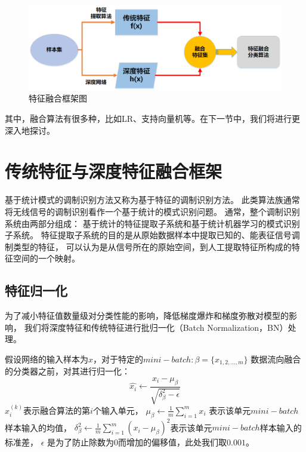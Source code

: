 \begin{figure}[!h]
	\centering
	\includegraphics[scale=0.5]{figures/chapter_4/fig_4_1.png}
	\caption{特征融合框架图}\label{sec:fig_4_1}
\end{figure}

其中，融合算法有很多种，比如LR、支持向量机等。在下一节中，我们将进行更深入地探讨。


\section{传统特征与深度特征融合框架}

基于统计模式的调制识别方法又称为基于特征的调制识别方法。
此类算法族通常将无线信号的调制识别看作一个基于统计的模式识别问题。
通常，整个调制识别系统由两部分组成：
基于统计的特征提取子系统和基于统计机器学习的模式识别子系统。
特征提取子系统的目的是从原始数据样本中提取已知的、能表征信号调制类型的特征，
可以认为是从信号所在的原始空间，到人工提取特征所构成的特征空间的一个映射。\par

\subsection{特征归一化}
\label{sec:feature_normalization}
为了减小特征值数量级对分类性能的影响，降低梯度爆炸和梯度弥散对模型的影响，
我们将深度特征和传统特征进行批归一化（Batch Normalization，BN）处理。\par

假设网络的输入样本为$x$，对于特定的$mini-batch: \beta=\{x_{1,2,...,m}\}$
数据流向融合的分类器之前，对其进行归一化：
\begin{equation}
	\label{eqt:4_18}
	\hat{x_i} \leftarrow \frac{x_i - \mu_\beta}{\sqrt{\delta_\beta^2 - \epsilon}}
\end{equation}
$x_i^{(k)}$表示融合算法的第$i$个输入单元，
$\mu_\beta \leftarrow \frac{1}{m}\sum_{i=1}^{m} x_i$ 表示该单元$mini-batch$样本输入的均值，
$	\delta_\beta^2 \leftarrow \frac{1}{m}\sum_{i=1}^{m}(x_i - \mu_\beta)^2$表示该单元$mini-batch$样本输入的标准差，
$\epsilon$ 是为了防止除数为$0$而增加的偏移值，此处我们取$0.001$。\par

